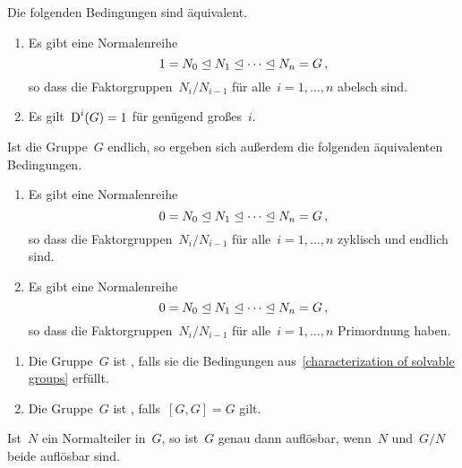 \begin{proposition}
  \label{characterization of solvable groups}
  Die folgenden Bedingungen sind äquivalent.
  \begin{enumerate}
    \item
      Es gibt eine Normalenreihe
      \[
        1
        =
        N_0
        \trianglelefteq
        N_1
        \trianglelefteq
        \dotsb
        \trianglelefteq
        N_n
        =
        G \,,
      \]
      so dass die Faktorgruppen~$N_i / N_{i-1}$ für alle~$i = 1, \dotsc, n$ abelsch sind.
    \item
      Es gilt~$\operatorname{D}^i(G) = 1$ für genügend großes~$i$.
  \end{enumerate}
  Ist die Gruppe~$G$ endlich, so ergeben sich außerdem die folgenden äquivalenten Bedingungen.
  \begin{enumerate}[resume*]
    \item
      Es gibt eine Normalenreihe
      \[
        0
        =
        N_0
        \trianglelefteq
        N_1
        \trianglelefteq
        \dotsb
        \trianglelefteq
        N_n
        =
        G \,,
      \]
      so dass die Faktorgruppen~$N_i / N_{i-1}$ für alle~$i = 1, \dotsc, n$ zyklisch und endlich sind.
    \item
      Es gibt eine Normalenreihe
      \[
        0
        =
        N_0
        \trianglelefteq
        N_1
        \trianglelefteq
        \dotsb
        \trianglelefteq
        N_n
        =
        G \,,
      \]
      so dass die Faktorgruppen~$N_i / N_{i-1}$ für alle~$i = 1, \dotsc, n$ Primordnung haben.
  \end{enumerate}
\end{proposition}

\begin{definition}
  \leavevmode
  \begin{enumerate}
    \item
      Die Gruppe~$G$ ist , falls sie die Bedingungen aus~\cref{characterization of solvable groups} erfüllt.
    \item
      Die Gruppe~$G$ ist , falls~$[G, G] = G$ gilt.
  \end{enumerate}
\end{definition}

\begin{lemma}
  \label{solveable via ses}
  Ist~$N$ ein Normalteiler in~$G$, so ist~$G$ genau dann auflösbar, wenn~$N$ und~$G/N$ beide auflösbar sind.
\end{lemma}

